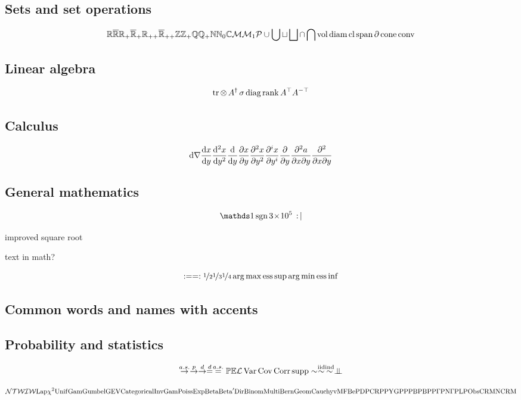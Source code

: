 \documentclass{article}
\begin{document}
\subsection{Sets and set operations}

\[
\mathbb{R} \overline{\mathbb{R}} \mathbb{R}_+ {\overline{\mathbb{R}}}_+ \mathbb{R}_{++} {\overline{\mathbb{R}}}_{++}
\mathbb{Z} \mathbb{Z}_+ \mathbb{Q} \mathbb{Q}_+ \mathbb{N} \mathbb{N}_{0} \mathbb{C} \mathcal{M}
\mathcal{M}_1 \mathcal{P} \cup \bigcup \sqcup \bigsqcup
\cap \bigcap \operatorname{vol} \operatorname{diam} \operatorname{cl} \operatorname{span} \partial \operatorname{cone} \operatorname{conv}
\]

\subsection{Linear algebra}

\[
\operatorname{tr} \operatorname{\otimes} A^{\dag} \operatorname{\sigma} \operatorname{diag} \operatorname{rank} A^{\top} A^{-\top}
\]

\subsection{Calculus}

\[
\mathrm{d} \nabla \frac{\mathrm{d} x}{\mathrm{d} y} \frac{\mathrm{d}^2 x}{\mathrm{d} y^2} \frac{\mathrm{d}}{\mathrm{d} y} \frac{\partial x}{\partial y} \frac{\partial^2 x}{\partial y^2} \frac{\partial^i x}{\partial y^i} \frac{\partial}{\partial y} \frac{\partial^2 a}{\partial x \partial y} \frac{\partial^2 }{\partial x \partial y}
\]

\subsection{General mathematics}

\[
\ind \sgn \scin{3}{5} \st \given
\] 

improved square root

text in math?

\[
\defas \defines \half \third \quarter \argmax \esssup \argmin \essinf
\]


\subsection{Common words and names with accents}
\cadlag
\Gronwall
\Renyi
\Holder
\Ito
\Nystrom
\Schatten
\Matern
\Frechet
\Levy

\subsection{Probability and statistics}
\iid \as \aev 
\[
\convas \convp \convd \eqd \eqas \Pr \EE \law \var \cov \corr \supp \dist \distiid \distind
\indep
\]

\[
\mathcal{N} \mathcal{T} \mathcal{W} \mathcal{IW} {\mathrm{Lap}} \chi^2 {\mathrm{Unif}} {\mathrm{Gam}} {\mathrm{Gumbel}} {\mathrm{GEV}} {\mathrm{Categorical}} {\mathrm{InvGam}} {\mathrm{Poiss}} \\
{\mathrm{Exp}} {\mathrm{Beta}} {\mathrm{Beta}}' {\mathrm{Dir}} {\mathrm{Binom}} {\mathrm{Multi}} {\mathrm{Bern}} {\mathrm{Geom}} {\mathrm{Cauchy}} {\mathrm{vMF}} \\
{\mathrm{BeP}} {\mathrm{DP}} {\mathrm{CRP}} {\mathrm{PY}} {{\mathrm{GP}}} {\mathrm{PP}} {\mathrm{BP}} {\mathrm{BPP}} {\mathrm{\Gamma P}} {\mathrm{N\Gamma P}} {\mathrm{LP}} {\mathrm{Obs}} {\mathrm{CRM}}
{\mathrm{NCRM}}
\]
\end{document}
